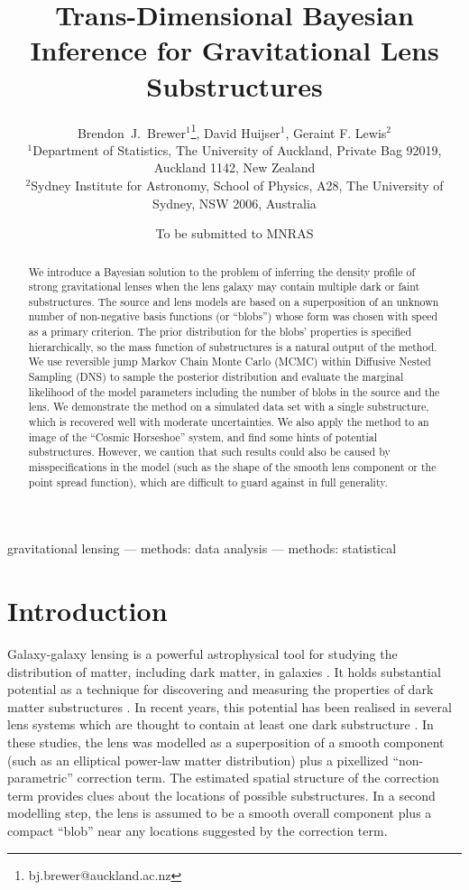 \documentclass[useAMS,usenatbib]{mn2e}
\title[]
{Trans-Dimensional Bayesian Inference for Gravitational Lens Substructures}
\author[Brewer, Huijser and Lewis]{%
  Brendon~J.~Brewer$^{1}$\thanks{bj.brewer@auckland.ac.nz},
  David Huijser$^{1}$,
  Geraint F. Lewis$^2$
  \medskip\\
  $^1$Department of Statistics, The University of Auckland, Private Bag 92019, Auckland 1142, New Zealand\\
  $^2$Sydney Institute for Astronomy, School of Physics, A28,
  The University of Sydney, NSW 2006, Australia}
\begin{document}
             
\date{To be submitted to MNRAS}
             
\maketitle

\label{firstpage}

\begin{abstract}
We introduce a Bayesian solution to the problem of inferring the density
profile of strong gravitational lenses when the lens galaxy may contain
multiple dark or faint substructures. The source and lens models are based on
a superposition of an unknown number of non-negative basis functions
(or ``blobs'') whose form was chosen with speed as a primary criterion.
The prior distribution for the blobs' properties is specified hierarchically,
so the mass function of substructures is a natural output of the method.
We use reversible
jump Markov Chain Monte Carlo (MCMC) within Diffusive Nested Sampling (DNS) to
sample the posterior distribution and evaluate the marginal likelihood of the
model parameters including the number of blobs in the source and the lens.
We demonstrate the method on a simulated data set with a single
substructure, which is recovered well with moderate uncertainties. We also
apply the method to an image of the ``Cosmic Horseshoe'' system, and find some
hints of potential substructures. However, we caution that such results could
also be caused by misspecifications in the model (such as the shape of
the smooth lens component or the point spread function),
which are difficult to guard against in full generality.
\end{abstract}


\begin{keywords}
gravitational lensing --- methods: data analysis --- methods: statistical
\end{keywords}

\section{Introduction}
Galaxy-galaxy lensing is a powerful astrophysical tool for studying
the distribution of matter, including dark matter, in galaxies
\citep{treu}. It holds substantial potential as a technique for discovering
and measuring the properties of dark matter substructures \citep{koopmans}.
In recent years, this potential has been realised in several lens systems
which are thought to contain at least one dark substructure
\citep{vegetti1, vegetti2, vegetti3}. In these studies, the lens was modelled
as a superposition of a smooth component (such as an elliptical power-law
matter distribution) plus a pixellized ``non-parametric'' correction term.
The estimated spatial structure of the correction term provides clues about
the locations of possible substructures. In a second modelling step, the lens
is assumed to be a smooth overall component plus a compact ``blob'' near any
locations suggested by the correction term.
\end{document}
